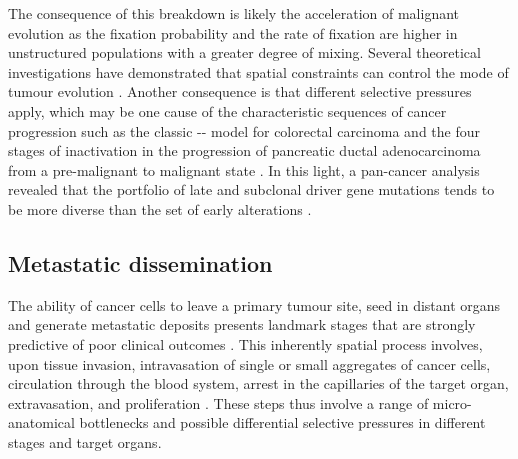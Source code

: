 The consequence of this breakdown is likely the acceleration of malignant evolution as the fixation probability and the rate of fixation are higher in unstructured populations with a greater degree of mixing. Several theoretical investigations have demonstrated that spatial constraints can control the mode of tumour evolution \parencite{West2021-ar,Noble2022-eg}. Another consequence is that different selective pressures apply, which may be one cause of the characteristic sequences of cancer progression such as the classic -- model for colorectal carcinoma \parencite{Fearon1990-el,Gerstung2020-sg} and the four stages of  inactivation in the progression of pancreatic ductal adenocarcinoma from a pre-malignant to malignant state \parencite{Baslan2022-rb}. In this light, a pan-cancer analysis revealed that the portfolio of late and subclonal driver gene mutations tends to be more diverse than the set of early alterations \parencite{Gerstung2020-sg}.

\subsection*{Metastatic dissemination}

The ability of cancer cells to leave a primary tumour site, seed in distant organs and generate metastatic deposits presents landmark stages that are strongly predictive of poor clinical outcomes \parencite{Lambert2017-ll}. This inherently spatial process involves, upon tissue invasion, intravasation of single or small aggregates of cancer cells, circulation through the blood system, arrest in the capillaries of the target organ, extravasation, and proliferation \parencite{Fidler2003-lh} . These steps thus involve a range of micro-anatomical bottlenecks and possible differential selective pressures in different stages and target organs.

